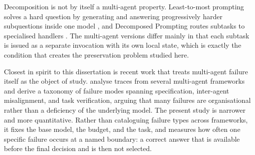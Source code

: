 Decomposition is not by itself a multi-agent property. Least-to-most prompting solves a hard question by generating and answering progressively harder subquestions inside one model \citep{zhou2023leasttomost}, and Decomposed Prompting routes subtasks to specialised handlers \citep{khot2023decomposed}. The multi-agent versions differ mainly in that each subtask is issued as a separate invocation with its own local state, which is exactly the condition that creates the preservation problem studied here.

Closest in spirit to this dissertation is recent work that treats multi-agent failure itself as the object of study. \citet{cemri2025why} analyse traces from several multi-agent frameworks and derive a taxonomy of failure modes spanning specification, inter-agent misalignment, and task verification, arguing that many failures are organisational rather than a deficiency of the underlying model. The present study is narrower and more quantitative. Rather than cataloguing failure types across frameworks, it fixes the base model, the budget, and the task, and measures how often one specific failure occurs at a named boundary: a correct answer that is available before the final decision and is then not selected.

